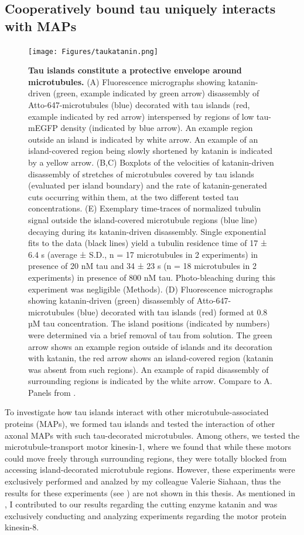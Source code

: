 \FloatBarrier
\subsection{Cooperatively bound tau uniquely interacts with MAPs}
\begin{figure}[h!]
\centering
\texttt{[image: Figures/taukatanin.png]}
\caption[Tau islands constitute a protective envelope around microtubules.]{
\textbf{Tau islands constitute a protective envelope around microtubules.} (A) Fluorescence micrographs showing katanin-driven (green, example indicated by green arrow) disassembly of Atto-647-microtubules (blue) decorated with tau islands (red, example indicated by red arrow) interspersed by regions of low tau-mEGFP density (indicated by blue arrow). An example region outside an island is indicated by white arrow. An example of an island-covered region being slowly shortened by katanin is indicated by a yellow arrow. (B,C) Boxplots of the velocities of katanin-driven disassembly of stretches of microtubules covered by tau islands (evaluated per island boundary) and the rate of katanin-generated cuts occurring within them, at the two different tested tau concentrations. (E) Exemplary time-traces of normalized tubulin signal outside the island-covered microtubule regions (blue line) decaying during its katanin-driven disassembly. Single exponential fits to the data (black lines) yield a tubulin residence time of 17 ± 6.4 s (average ± S.D., n = 17 microtubules in 2 experiments) in presence of 20 nM tau and 34 ± 23 s (n = 18 microtubules in 2 experiments) in presence of 800 nM tau. Photo-bleaching during this experiment was negligible (Methods). (D) Fluorescence micrographs showing katanin-driven (green) disassembly of Atto-647-microtubules (blue) decorated with tau islands (red) formed at 0.8 µM tau concentration. The island positions (indicated by numbers) were determined via a brief removal of tau from solution. The green arrow shows an example region outside of islands and its decoration with katanin, the red arrow shows an island-covered region (katanin was absent from such regions). An example of rapid disassembly of surrounding regions is indicated by the white arrow. Compare to A. Panels from \cite{Siahaan2019a}.
	}\label{taukatanin}
\end{figure}
To investigate how tau islands interact with other microtubule-associated proteins (MAPs), we formed tau islands and tested the interaction of other axonal MAPs with such tau-decorated microtubules. Among others, we tested the microtubule-transport motor kinesin-1, where we found that while these motors could move freely through surrounding regions, they were totally blocked from accessing island-decorated microtubule regions. However, these experiments were exclusively performed and analzed by my colleague Valerie Siahaan, thus the results for these experiments (see \cite{Siahaan2019a}) are not shown in this thesis. As mentioned in , I contributed to our results regarding the cutting enzyme katanin and was exclusively conducting and analyzing experiments regarding the motor protein kinesin-8.\par

